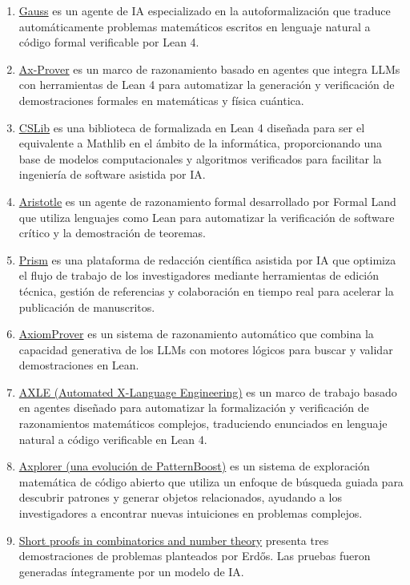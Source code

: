 \documentclass[12pt,a4paper]{article}
\begin{document}
\begin{enumerate}
\item \href{https://www.math.inc/gauss}{Gauss} es un agente de IA especializado en la autoformalización que traduce automáticamente problemas matemáticos escritos en lenguaje natural a código formal verificable por Lean 4.
\item \href{https://arxiv.org/abs/2510.12787v2}{Ax-Prover} es un marco de razonamiento basado en agentes que integra LLMs con herramientas de Lean 4 para automatizar la generación y verificación de demostraciones formales en matemáticas y física cuántica.
\item \href{https://www.cslib.io/}{CSLib} es una biblioteca de formalizada en Lean 4 diseñada para ser el equivalente a Mathlib en el ámbito de la informática, proporcionando una base de modelos computacionales y algoritmos verificados para facilitar la ingeniería de software asistida por IA.
\item \href{https://aristotle.harmonic.fun/}{Aristotle} es un agente de razonamiento formal desarrollado por Formal Land que utiliza lenguajes como Lean para automatizar la verificación de software crítico y la demostración de teoremas.
\item \href{https://openai.com/es-ES/index/introducing-prism/}{Prism} es una plataforma de redacción científica asistida por IA que optimiza el flujo de trabajo de los investigadores mediante herramientas de edición técnica, gestión de referencias y colaboración en tiempo real para acelerar la publicación de manuscritos.
\item \href{https://github.com/AxiomMath/putnam2025}{AxiomProver} es un sistema de razonamiento automático que combina la capacidad generativa de los LLMs con motores lógicos para buscar y validar demostraciones en Lean.
\item \href{https://axiommath.ai/territory/releasing-axle}{AXLE (Automated X-Language Engineering)} es un marco de trabajo basado en agentes diseñado para automatizar la formalización y verificación de razonamientos matemáticos complejos, traduciendo enunciados en lenguaje natural a código verificable en Lean 4.
\item \href{https://axiommath.ai/territory/axplorer}{Axplorer (una evolución de PatternBoost)} es un sistema de exploración matemática de código abierto que utiliza un enfoque de búsqueda guiada para descubrir patrones y generar objetos relacionados, ayudando a los investigadores a encontrar nuevas intuiciones en problemas complejos.
\item \href{https://arxiv.org/pdf/2603.29961v1}{Short proofs in combinatorics and number theory} presenta tres demostraciones de problemas planteados por Erdős. Las pruebas fueron generadas íntegramente por un modelo de IA.

\end{enumerate}
\end{document}
